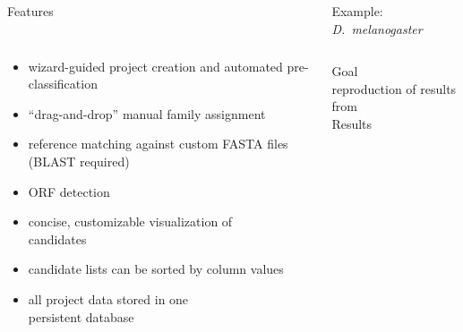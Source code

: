 \documentclass[final]{beamer}
\begin{document}
\begin{frame}[fragile]
\begin{columns}[t]
\begin{column}{.45\linewidth}
 \begin{columns}[t]
          \begin{column}{.45\linewidth}
           \vspace{-1cm}
              \begin{block}{Features}
                \begin{columns}
                    \begin{itemize}
                      \item wizard-guided project creation and
                            automated pre-classification
                      \item ``drag-and-drop'' manual family assignment
                      \item reference matching against custom FASTA files
                            (BLAST required)
                      \item ORF detection
                      \item concise, customizable visualization of\\
                            candidates~\cite{STEI:GRE:SCHAE:MAD:KUR:2009}
                      \item candidate lists can be sorted by column values
                      \item all project data stored in one\\persistent database
                    \end{itemize}
                    \vspace{2mm}
                \end{columns}
            \end{block}
          \end{column}
          \begin{column}{.51\linewidth}
\vspace{-1.25cm}
            \begin{block}{Example: \emph{D.~melanogaster}}
              \begin{columns}
                    \alert{Goal}\\
                    reproduction of results from~\cite{STEI:WIL:GRE:KUR:2009}
                    \\[3mm]
                    \alert{Results}

\end{columns}
\end{block}
\end{column}
\end{columns}
\end{column}
\end{columns}
\end{frame}
\end{document}
